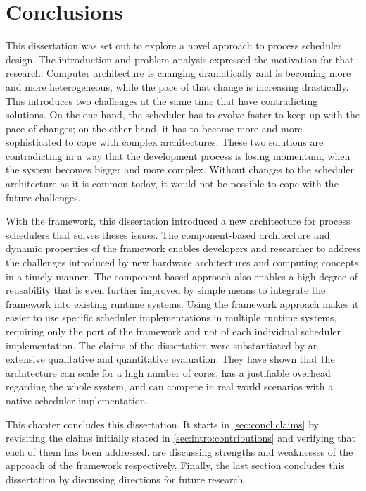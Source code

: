 \chapter{Conclusions}%
\label{chap:conclusion}

This dissertation was set out to explore a novel approach to process scheduler design. The introduction and problem analysis expressed the motivation for that research: Computer architecture is changing dramatically and is becoming more and more heterogeneous, while the pace of that change is increasing drastically. This introduces two challenges at the same time that have contradicting solutions. On the one hand, the scheduler has to evolve faster to keep up with the pace of changes; on the other hand, it has to become more and more sophisticated to cope with complex architectures. These two solutions are contradicting in a way that the development process is losing momentum, when the system becomes bigger and more complex. Without changes to the scheduler architecture as it is common today, it would not be possible to cope with the future challenges.

With the \cobas{} framework, this dissertation introduced a new architecture for process schedulers that solves theses issues. The component-based architecture and dynamic properties of the \cobas{} framework enables developers and researcher to address the challenges introduced by new hardware architectures and computing concepts in a timely manner. The component-based approach also enables a high degree of reusability that is even further improved by simple means to integrate the framework into existing runtime systems. Using the framework approach makes it easier to use specific scheduler implementations in multiple runtime systems, requiring only the port of the framework and not of each individual scheduler implementation. The claims of the dissertation were substantiated by an extensive qualitative and quantitative evaluation. They have shown that the \cobas{} architecture can scale for a high number of cores, has a justifiable overhead regarding the whole system, and can compete in real world scenarios with a native scheduler implementation.

This chapter concludes this dissertation. It starts in \cref{sec:concl:claims} by revisiting the claims initially stated in \cref{sec:intro:contributions} and verifying that each of them has been addressed.  are discussing strengths and weaknesses of the approach of the \cobas{} framework respectively. Finally, the last section concludes this dissertation by discussing directions for future research.

